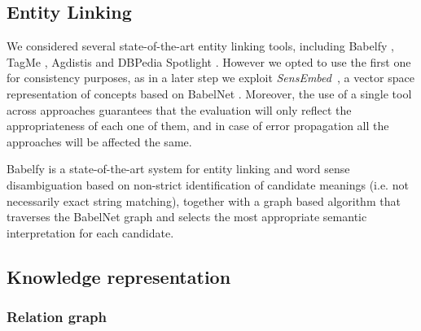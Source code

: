 \subsection{Entity Linking} %
%

We considered several state-of-the-art entity linking tools, including Babelfy \cite{Moroetal2014b}, TagMe \cite{Ferraginaetal2010}, Agdistis \cite{Usbecketal2014} and DBPedia Spotlight \cite{Mendes2011}. However we opted to use the first one for consistency purposes, as in a later step we exploit \textit{SensEmbed}~\cite{Iacobaccietal2015}, a vector space representation of concepts based on BabelNet \cite{Navigli2010}. Moreover, the use of a single tool across approaches guarantees that the evaluation will only reflect the appropriateness of each one of them, and in case of error propagation all the approaches will be affected the same.

Babelfy \cite{Moroetal2014b} is a state-of-the-art system for entity linking and word sense disambiguation based on non-strict identification of candidate meanings (i.e. not necessarily exact string matching), together with a graph based algorithm that traverses the BabelNet graph and selects the most appropriate semantic interpretation for each candidate.

\subsection{Knowledge representation}\label{sec:similarity:knowledge_representations}

\subsubsection{Relation graph}\label{sec:similarity:rel_graph} %

